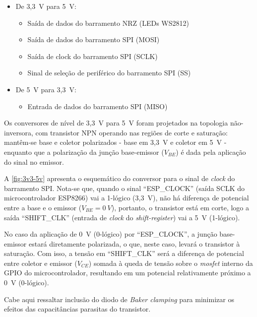 \begin{itemize}
    \item De {3,3\ V} para {5\ V}:
        \begin{itemize}
            \item Saída de dados do barramento NRZ (LEDs WS2812)
            \item Saída de dados do barramento SPI (MOSI)
            \item Saída de clock do barramento SPI (SCLK)
            \item Sinal de seleção de periférico do barramento SPI (SS)
        \end{itemize}
    \item De {5\ V} para {3,3\ V}:
        \begin{itemize}
            \item Entrada de dados do barramento SPI (MISO)
        \end{itemize}
\end{itemize}

Os conversores de nível de {3,3\ V} para {5\ V} foram projetados na topologia não-inversora, com transistor NPN operando nas regiões de corte e saturação: mantêm-se base e coletor polarizados - base em {3,3\ V} e coletor em {5\ V} - enquanto que a polarização da junção base-emissor ($V_{BE}$) é dada pela aplicação do sinal no emissor.

A \autoref{fig:3v3-5v} apresenta o esquemático do conversor para o sinal de \emph{clock} do barramento SPI. Nota-se que, quando o sinal ``ESP\_CLOCK'' (saída SCLK do microcontrolador ESP8266) vai a 1-lógico ({3,3\ V}), não há diferença de potencial entre a base e o emissor ({$V_{BE}=0\ V$}), portanto, o transistor está em corte, logo a saída ``SHIFT\_CLK'' (entrada de \emph{clock} do \emph{shift-register}) vai a {5\ V} (1-lógico).

No caso da aplicação de {0\ V} (0-lógico) por ``ESP\_CLOCK'', a junção base-emissor estará diretamente polarizada, o que, neste caso, levará o transistor à saturação. Com isso, a tensão em ``SHIFT\_CLK'' será a diferença de potencial entre coletor e emissor ($V_{CE}$) somada à queda de tensão sobre o \emph{mosfet} interno da GPIO do microcontrolador, resultando em um potencial relativamente próximo a {0\ V} (0-lógico).

Cabe aqui ressaltar inclusão do diodo de \emph{Baker clamping} para minimizar os efeitos das capacitâncias parasitas do transistor.

